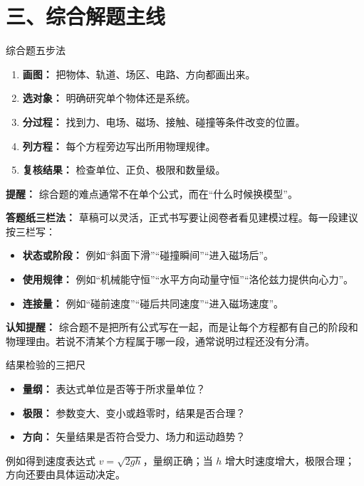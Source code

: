 \section*{三、综合解题主线}

\begin{conceptbox}{综合题五步法}

\begin{enumerate}
  \item \textbf{画图：} 把物体、轨道、场区、电路、方向都画出来。
  \item \textbf{选对象：} 明确研究单个物体还是系统。
  \item \textbf{分过程：} 找到力、电场、磁场、接触、碰撞等条件改变的位置。
  \item \textbf{列方程：} 每个方程旁边写出所用物理规律。
  \item \textbf{复核结果：} 检查单位、正负、极限和数量级。
\end{enumerate}

\textbf{提醒：} 综合题的难点通常不在单个公式，而在“什么时候换模型”。

\textbf{答题纸三栏法：} 草稿可以灵活，正式书写要让阅卷者看见建模过程。每一段建议按三栏写：
\begin{itemize}
  \item \textbf{状态或阶段：} 例如“斜面下滑”“碰撞瞬间”“进入磁场后”。
  \item \textbf{使用规律：} 例如“机械能守恒”“水平方向动量守恒”“洛伦兹力提供向心力”。
  \item \textbf{连接量：} 例如“碰前速度”“碰后共同速度”“进入磁场速度”。
\end{itemize}

\textbf{认知提醒：} 综合题不是把所有公式写在一起，而是让每个方程都有自己的阶段和物理理由。若说不清某个方程属于哪一段，通常说明过程还没有分清。
\end{conceptbox}

\begin{conceptbox}{结果检验的三把尺}

\begin{itemize}
  \item \textbf{量纲：} 表达式单位是否等于所求量单位？
  \item \textbf{极限：} 参数变大、变小或趋零时，结果是否合理？
  \item \textbf{方向：} 矢量结果是否符合受力、场力和运动趋势？
\end{itemize}

例如得到速度表达式 $v=\sqrt{2gh}$，量纲正确；当 $h$ 增大时速度增大，极限合理；方向还要由具体运动决定。
\end{conceptbox}

